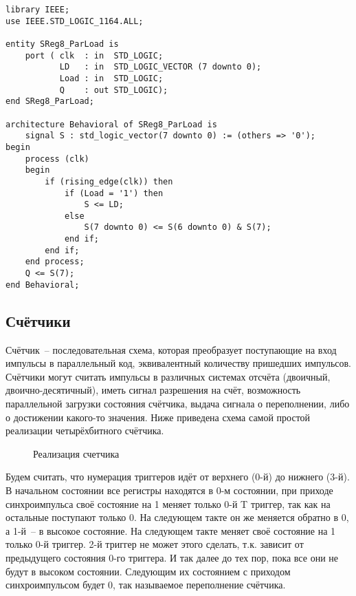 \begin{Code}
\begin{lstlisting}
library IEEE;
use IEEE.STD_LOGIC_1164.ALL;

entity SReg8_ParLoad is
    port ( clk  : in  STD_LOGIC;
           LD   : in  STD_LOGIC_VECTOR (7 downto 0);
           Load : in  STD_LOGIC;
           Q    : out STD_LOGIC);
end SReg8_ParLoad;

architecture Behavioral of SReg8_ParLoad is
    signal S : std_logic_vector(7 downto 0) := (others => '0');
begin
    process (clk)
    begin
        if (rising_edge(clk)) then
            if (Load = '1') then
                S <= LD;
            else
                S(7 downto 0) <= S(6 downto 0) & S(7);
            end if;
        end if;
    end process;
    Q <= S(7);
end Behavioral;
\end{lstlisting}
\end{Code}

\subsection{Счётчики}

Счётчик~-- последовательная схема, которая преобразует поступающие на вход импульсы в параллельный код, эквивалентный количеству пришедших импульсов. Счётчики могут считать импульсы в различных системах отсчёта (двоичный, двоично-десятичный), иметь сигнал разрешения на счёт, возможность параллельной загрузки состояния счётчика, выдача сигнала о переполнении, либо о достижении какого-то значения. Ниже приведена схема самой простой реализации четырёхбитного счётчика.

\begin{figure}[ht]
\centering
{}
\caption{Реализация счетчика}
\label{counter_arch}
\end{figure}
 
Будем считать, что нумерация триггеров идёт от верхнего (0-й) до нижнего (3-й). В начальном состоянии все регистры находятся в 0-м состоянии, при приходе синхроимпульса своё состояние на 1 меняет только 0-й T триггер, так как на остальные поступают только 0. На следующем такте он же меняется обратно в 0, а 1-й~-- в высокое состояние. На следующем такте меняет своё состояние на 1 только 0-й триггер. 2-й триггер не может этого сделать, т.к. зависит от предыдущего состояния 0-го триггера. И так далее до тех пор, пока все они не будут в высоком состоянии. Следующим их состоянием с приходом синхроимпульсом будет 0, так называемое переполнение счётчика. 

